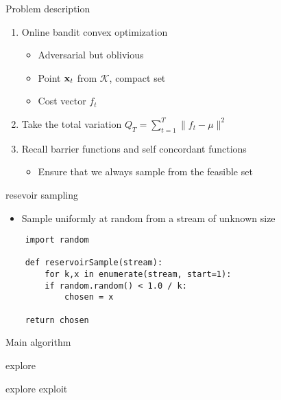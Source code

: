 \documentclass{beamer}
\begin{document}
\begin{frame}{Problem description}
  \begin{enumerate}
    \item
    Online bandit convex optimization
    \begin{itemize}
      \item
        Adversarial but oblivious
      \item
        Point ${\bf x}_t$ from $\mathcal{K}$, compact set
      \item
        Cost vector $f_{t}$
      \end{itemize}
    \item
      Take the total variation
      $Q_T=\sum_{t=1}^T \| f_t - \mu \|^2$
    \item
      Recall barrier functions and self concordant functions
      \begin{itemize}
        \item
          Ensure that we always sample from the feasible set
        \end{itemize}
        

    \end{enumerate}
  \end{frame}
       
\begin{frame}[fragile]{resevoir sampling}
  \begin{itemize}
  \item
      Sample uniformly at random from a stream of unknown size
 \end{itemize}

  \lstset{language=Python}
  \lstset{frame=lines}
  \lstset{basicstyle=\footnotesize}
  \begin{lstlisting}
    import random

    def reservoirSample(stream):
        for k,x in enumerate(stream, start=1):
        if random.random() < 1.0 / k:
            chosen = x

    return chosen
  \end{lstlisting}
\end{frame}

\begin{frame}{Main algorithm}
  
\end{frame}

\begin{frame}{explore}
  
\end{frame}
\begin{frame}{explore exploit}
  
\end{frame}
\end{document}

